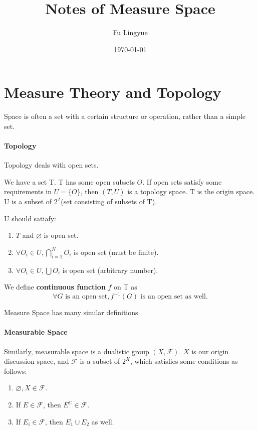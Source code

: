 
\author{Fu Lingyue}
\title{Notes of Measure Space}
\date{\today}

\maketitle

\section{Measure Theory and Topology}

Space is often a set with a certain structure or operation, rather than a simple set.
\paragraph{Topology} Topology deals with open sets. 

We have a set T. T has some open subsets $O$.  If open sets satisfy some requirements in $U = \{O\}$, then $(T,U)$ is a topology space. T is the origin space. U is a subset of $2^T$(set consisting of subsets of T).

U should satiafy:
\begin{enumerate}
  \item $T$ and $\varnothing$ is open set.
  \item $\forall O_i \in U,  \bigcap_{i=1}^N O_i$ is open set (must be finite).
  \item $\forall O_i \in U, \bigcup O_i$ is open set (arbitrary number).
  
\end{enumerate}

We define \textbf{continuous function} $f$ on T as 
$$\forall G \text{ is an open set}, f^{-1}(G) \text{ is an open set as well}.$$

Measure Space has many similar definitions.
\paragraph{Measurable Space} Similarly, measurable space is a dualistic group $(X,\mathcal F)$. $X$ is our origin discussion space, and $\mathcal F$ is a subset of $2^X$, which satisfies some conditions as follows: 
\begin{enumerate}
  \item $\varnothing, X \in \mathcal F$.
  \item If $E\in \mathcal F$, then $E^C\in \mathcal F$.
  \item If $E_i\in \mathcal F$, then $E_1 \cup E_2$ as well.
\end{enumerate}

